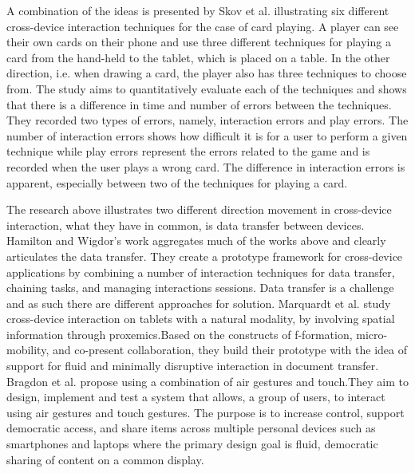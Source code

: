 A combination of the ideas is presented by Skov et al. \cite{Skov:2015} illustrating six different cross-device interaction techniques for the case of card playing.
A player can see their own cards on their phone and use three different techniques for playing a card from the hand-held to the tablet, which is placed on a table.
In the other direction, i.e. when drawing a card, the player also has three techniques to choose from.
The study aims to quantitatively evaluate each of the techniques and shows that there is a difference in time and number of errors between the techniques. 
They recorded two types of errors, namely, interaction errors and play errors.
The number of interaction errors shows how difficult it is for a user to perform a given technique while play errors represent the errors related to the game and is recorded when the user plays a wrong card.
The difference in interaction errors is apparent, especially between two of the techniques for playing a card.

The research above illustrates two different direction movement in cross-device interaction, what they have in common, is data transfer between devices.
Hamilton and Wigdor's  work \cite{Hamilton:2014} aggregates much of the works above and clearly articulates the data transfer. They create a prototype framework for cross-device applications by combining a number of interaction techniques for data transfer, chaining tasks, and managing interactions sessions.
Data transfer is a challenge and as such there are different approaches for solution. Marquardt et al. \cite{Marquardt:2012} study cross-device interaction on tablets with a  natural modality, by involving spatial information through proxemics.Based on the constructs of f-formation, micro-mobility, and co-present collaboration, they build their prototype with the idea of support for fluid and minimally disruptive interaction in document transfer. 
Bragdon et al.\cite{Bragdon:2011} propose using a combination of air gestures and touch.They aim to design, implement and test a system that allows, a group of users, to interact using air gestures and touch gestures. The purpose is to increase control, support democratic access, and share items across multiple personal devices such as smartphones and laptops where the primary design goal is fluid, democratic sharing of content on a common display.
